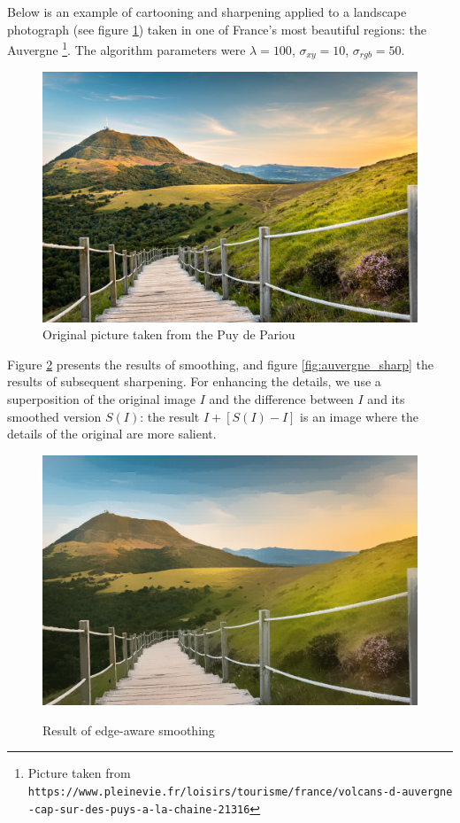 \documentclass{article}
\begin{document}
\medskip

Below is an example of cartooning and sharpening applied to a landscape photograph (see figure \ref{fig:auvergne_original}) taken in one of France's most beautiful regions: the Auvergne \footnote{Picture taken from \texttt{https://www.pleinevie.fr/loisirs/tourisme/france/volcans-d-auvergne\\-cap-sur-des-puys-a-la-chaine-21316}}. The algorithm parameters were $\lambda = 100$, $\sigma_{xy} = 10$, $\sigma_{rgb} = 50$.

\begin{figure}
    \centering
    \includegraphics[width=12cm]{../code/results/smoothing_auvergne_ref.png}
    \caption{Original picture taken from the Puy de Pariou}
    \label{fig:auvergne_original}
\end{figure}

Figure \ref{fig:auvergne_smooth} presents the results of smoothing, and figure \ref{fig:auvergne_sharp} the results of subsequent sharpening. For enhancing the details, we use a superposition of the original image $I$ and the difference between $I$ and its smoothed version $S(I)$: the result $I + [S(I) - I]$ is an image where the details of the original are more salient.


\begin{figure}
    \centering
    \includegraphics[width=12cm]{../code/results/smoothing_auvergne_new.png}
    \label{fig:auvergne_smooth}
    \caption{Result of edge-aware smoothing}
\end{figure}
\end{document}
